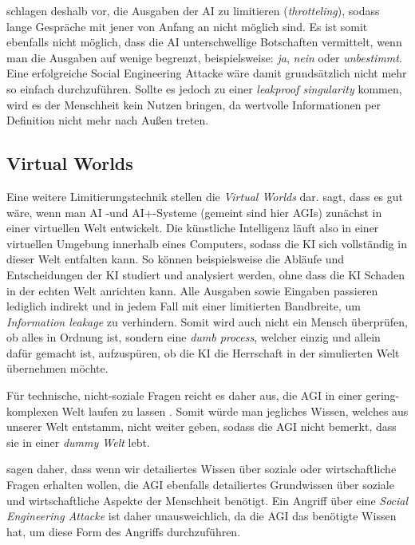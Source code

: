         \citealp{armstrongforthcoming} schlagen deshalb vor, die Ausgaben der AI zu limitieren (\textit{throtteling}), sodass
        lange Gespräche mit jener von Anfang an nicht möglich sind.\cite[s. 306]{armstrongforthcoming} Es ist somit
        ebenfalls nicht möglich, dass die AI unterschwellige Botschaften vermittelt, wenn man die Ausgaben auf wenige
        begrenzt, beispielsweise: \textit{ja}, \textit{nein} oder \textit{unbestimmt}. Eine erfolgreiche Social Engineering
        Attacke wäre damit grundsätzlich nicht mehr so einfach durchzuführen.\cite[s. 309]{armstrongforthcoming}
        Sollte es jedoch zu einer \textit{leakproof singularity} kommen, wird es der Menschheit kein Nutzen bringen, da
        wertvolle Informationen per Definition nicht mehr nach Außen treten.

        \subsection{Virtual Worlds}
        Eine weitere Limitierungstechnik stellen die \textit{Virtual Worlds} dar. \citeauthor{chalmers2010singularity} sagt,
        dass es gut wäre, wenn man AI -und AI+-Systeme (gemeint sind hier AGIs) zunächst in einer virtuellen Welt
        entwickelt. \cite[s. 37]{chalmers2010singularity} Die künstliche Intelligenz läuft also in einer virtuellen Umgebung
        innerhalb eines Computers, sodass die KI sich vollständig in dieser Welt entfalten kann. So können beispielsweise
        die Abläufe und Entscheidungen der KI studiert und analysiert werden, ohne dass die KI Schaden in der echten Welt
        anrichten kann. Alle Ausgaben sowie Eingaben passieren lediglich indirekt und in jedem Fall mit einer limitierten
        Bandbreite, um \textit{Information leakage} zu verhindern. \cite[s. 310]{armstrongforthcoming} Somit wird auch
        nicht ein Mensch überprüfen, ob alles in Ordnung ist, sondern eine \textit{dumb process}, welcher einzig und allein
        dafür gemacht ist, aufzuspüren, ob die KI die Herrschaft in der simulierten Welt übernehmen möchte.

        Für technische, nicht-soziale Fragen reicht es daher aus, die AGI in einer gering-komplexen Welt laufen zu lassen
        \cite[s. 310]{armstrongforthcoming}. Somit würde man jegliches Wissen, welches aus unserer Welt entstamm, nicht
        weiter geben, sodass die AGI nicht bemerkt, dass sie in einer \textit{dummy Welt} lebt.

        \citealp{armstrongforthcoming} sagen daher, dass wenn wir detailiertes Wissen über soziale oder wirtschaftliche
        Fragen erhalten wollen, die AGI ebenfalls detailiertes Grundwissen über soziale und wirtschaftliche Aspekte der
        Menschheit benötigt. Ein Angriff über eine \textit{Social Engineering Attacke} ist daher unausweichlich, da die
        AGI das benötigte Wissen hat, um diese Form des Angriffs durchzuführen.\cite[s. 310]{armstrongforthcoming}

